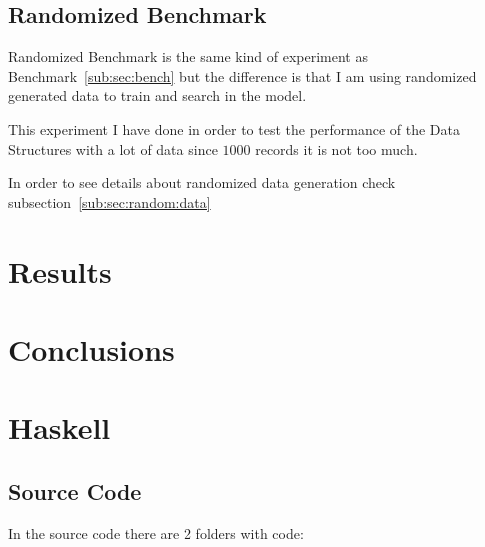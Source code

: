 \documentclass[12pt, a4paper]{article}
\begin{document}
\subsection{Randomized Benchmark}
Randomized Benchmark is the same kind of experiment as Benchmark~\ref{sub:sec:bench} but the difference is that I am using randomized generated data to train and search in the model.

This experiment I have done in order to test the performance of the Data Structures with a lot of data since $1000$ records it is not too much.

In order to see details about randomized data generation check subsection~\ref{sub:sec:random:data}

\section{Results}

\section{Conclusions}




\printglossary[type=\acronymtype]

\appendix\label{apx:org}
\section{Haskell}
\subsection{Source Code}
In the source code there are 2 folders with code:
\end{document}

